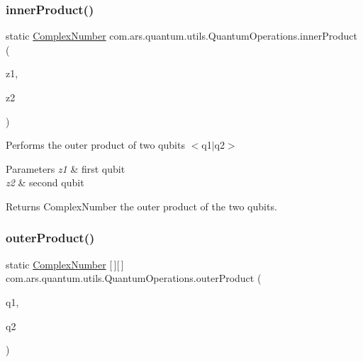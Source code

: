 \subsubsection{\texorpdfstring{inner\+Product()}{innerProduct()}\hspace{0.1cm}{\footnotesize\ttfamily [2/2]}}
{\footnotesize\ttfamily static \hyperlink{classcom_1_1ars_1_1complexnumbers_1_1_complex_number}{Complex\+Number} com.\+ars.\+quantum.\+utils.\+Quantum\+Operations.\+inner\+Product (\begin{DoxyParamCaption}\item[{\hyperlink{classcom_1_1ars_1_1complexnumbers_1_1_complex_number}{Complex\+Number} \mbox{[}$\,$\mbox{]}}]{z1,  }\item[{\hyperlink{classcom_1_1ars_1_1complexnumbers_1_1_complex_number}{Complex\+Number} \mbox{[}$\,$\mbox{]}}]{z2 }\end{DoxyParamCaption})\hspace{0.3cm}{\ttfamily [static]}}

Performs the outer product of two qubits $<$q1$\vert$q2$>$


\begin{DoxyParams}{Parameters}
{\em z1} & first qubit \\
\hline
{\em z2} & second qubit \\
\hline
\end{DoxyParams}
\begin{DoxyReturn}{Returns}
Complex\+Number the outer product of the two qubits. 
\end{DoxyReturn}
\hypertarget{classcom_1_1ars_1_1quantum_1_1utils_1_1_quantum_operations_a52a3eb03179e67e2a786cd724ff135bf}{}\label{classcom_1_1ars_1_1quantum_1_1utils_1_1_quantum_operations_a52a3eb03179e67e2a786cd724ff135bf} 
\subsubsection{\texorpdfstring{outer\+Product()}{outerProduct()}\hspace{0.1cm}{\footnotesize\ttfamily [1/2]}}
{\footnotesize\ttfamily static \hyperlink{classcom_1_1ars_1_1complexnumbers_1_1_complex_number}{Complex\+Number} \mbox{[}$\,$\mbox{]}\mbox{[}$\,$\mbox{]} com.\+ars.\+quantum.\+utils.\+Quantum\+Operations.\+outer\+Product (\begin{DoxyParamCaption}\item[{\hyperlink{classcom_1_1ars_1_1qubits_1_1_qubit}{Qubit}}]{q1,  }\item[{\hyperlink{classcom_1_1ars_1_1qubits_1_1_qubit}{Qubit}}]{q2 }\end{DoxyParamCaption})\hspace{0.3cm}{\ttfamily [static]}}

